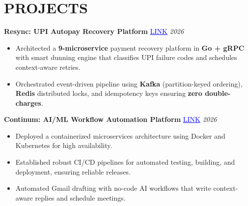 \documentclass[letterpaper,9.5pt]{article}
\begin{document}
\section{PROJECTS}

\vspace{1pt}
\noindent\textbf{Resync: UPI Autopay Recovery Platform} \textbar{} \href{https://resync.biz}{\textcolor{blue}{\underline{LINK}}} \hfill \textit{2026}
\begin{itemize}
  \item Architected a \textbf{9-microservice} payment recovery platform in \textbf{Go + gRPC} with smart dunning engine that classifies UPI failure codes and schedules context-aware retries.
  \item Orchestrated event-driven pipeline using \textbf{Kafka} (partition-keyed ordering), \textbf{Redis} distributed locks, and idempotency keys ensuring \textbf{zero double-charges}.
\end{itemize}

\vspace{1pt}
\noindent\textbf{Continum: AI/ML Workflow Automation Platform} \textbar{} \href{https://continum.online}{\textcolor{blue}{\underline{LINK}}} \hfill \textit{2026}
\begin{itemize}
  \item Deployed a containerized microservices architecture using Docker and Kubernetes for high availability.
  \item Established robust CI/CD pipelines for automated testing, building, and deployment, ensuring reliable releases.
  \item Automated Gmail drafting with no-code AI workflows that write context-aware replies and schedule meetings.
\end{itemize}

\end{document}
